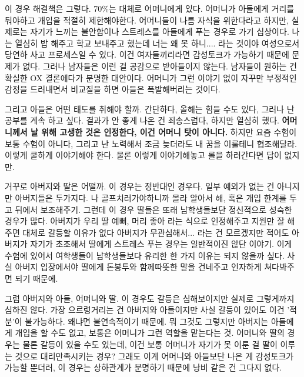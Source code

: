 이 경우 해결책은 그렇다. 70$\%$는 대체로 어머니에게 있다. 어머니가 아들에게 거리를 둬야하고 개입을 적절히 제한해야한다.
어머니들이 나름 자식을 위한다라고 하지만, 실제로는 자기가 느끼는 불안함이나 스트레스를 아들에게 푸는 경우로 가기 십상이다.
나는 열심히 밥 해주고 학교 보내주고 했는데 너는 왜 못 하니.... 라는 것이야 여성으로서 당연하 사고 프로세스일 수 있다.
이건 여자들끼리라면 감성토크가 가능하기 때문에 문제가 없다. 그러나 남자들은 이런 걸 공감으로 받아들이지 않는다.
남자들이 원하는 건 확실한 OX 결론에다가 분명한 대안이다.
어머니가 그런 이야기 없이 자꾸만 부정적인 감정을 드러내면서 비교질을 하면 아들은 폭발해버리는 것이다.
\vspace{5mm}

그리고 아들은 어떤 태도를 취해야 할까.
간단하다, 올해는 힘들 수도 있다, 그러나 난 공부를 계속 하고 싶다. 결과가 안 좋게 나온 건 죄송스럽다, 하지만 열심히 했다.
\textbf{어머니께서 날 위해 고생한 것은 인정한다, 이건 어머니 탓이 아니다.}
하지만 요즘 수험이 보통 수험이 아니다, 그리고 난 노력해서 조금 늦더라도 내 꿈을 이룰테니 협조해달라.
이렇게 쿨하게 이야기해야 한다. 물론 이렇게 이야기해놓고 롤을 하러간다면 답이 없지만.
\vspace{5mm}

거꾸로 아버지와 딸은 어떨까. 이 경우는 정반대인 경우다.
일부 예외가 없는 건 아니지만 아버지들은 두가지다. 나 골프치러가야하니까 몰라 알아서 해, 혹은 개입 한계를 두고 뒤에서 보조해주기.
그런데 이 경우 딸들은 또래 남학생들보단 정신적으로 성숙한 경우가 많다.
아버지가 우리 딸 예뻐, 머리 좋아 라는 식으로 인정해주고 지원만 잘 해주면 대체로 갈등할 이유가 없다
아버지가 무관심해서... 라는 건 모르겠지만 적어도 아버지가 자기가 초조해서 딸에게 스트레스 푸는 경우는 일반적이진 않단 이야기.
이게 수험에 있어서 여학생들이 남학생들보다 유리한 한 가지 이유는 되지 않을까 싶다.
사실 아버지 입장에서야 딸에게 돈봉투와 함께따뜻한 말을 건네주고 인자하게 쳐다봐주면 되기 때문에.
\vspace{5mm}

그럼 아버지와 아들, 어머니와 딸.
이 경우도 갈등은 심해보이지만 실제로 그렇게까지 심하진 않다.
가장 으르렁거리는 건 아버지와 아들이지만 사실 갈등이 있어도 이건 '적분'이 불가능하다. 왜냐면 불연속적이기 때문에.
뭐 그것도 그렇지만 아버지는 아들에게 개입을 할 수도 없고, 보통은 어머니가 그런 역할을 맡는다는 것.
어머니와 딸의 경우는 물론 갈등이 있을 수도 있는데, 이건 보통 어머니가 자기가 못 이룬 걸 딸이 이루는 것으로 대리만족시키는 경우?
그래도 이게 어머니와 아들보단 나은 게 감성토크가 가능할 뿐더러, 이 경우는 상하관계가 분명하기 때문에 낭비 같은 건 그다지 없다.
\vspace{5mm}

